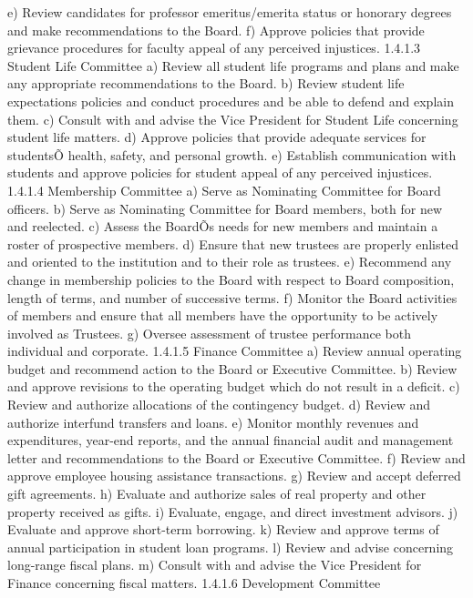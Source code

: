 \documentclass[letterpaper, 11pt]{article}
\begin{document}
			e) Review candidates for professor emeritus/emerita status or honorary degrees and make recommendations to the Board.
			f) Approve policies that provide grievance procedures for faculty appeal of any perceived injustices.
			1.4.1.3 Student Life Committee
			a) Review all student life programs and plans and make any appropriate recommendations to the Board.
			b) Review student life expectations policies and conduct procedures and be able to defend and explain them.
			c) Consult with and advise the Vice President for Student Life concerning student life matters.
			d) Approve policies that provide adequate services for studentsÕ health, safety, and personal growth.
			e) Establish communication with students and approve policies for student appeal of any perceived injustices.
			1.4.1.4 Membership Committee
			a) Serve as Nominating Committee for Board officers.
			b) Serve as Nominating Committee for Board members, both for new and reelected.
			c) Assess the BoardÕs needs for new members and maintain a roster of prospective members.
			d) Ensure that new trustees are properly enlisted and oriented to the institution and to their role as trustees.
			e) Recommend any change in membership policies to the Board with respect to Board composition, length of terms, and number of successive terms.
			f) Monitor the Board activities of members and ensure that all members have the opportunity to be actively involved as Trustees.
			g) Oversee assessment of trustee performance both individual and corporate.
			1.4.1.5 Finance Committee
			a) Review annual operating budget and recommend action to the Board or Executive Committee.
			b) Review and approve revisions to the operating budget which do not result in a deficit.
			c) Review and authorize allocations of the contingency budget.
			d) Review and authorize interfund transfers and loans.
			e) Monitor monthly revenues and expenditures, year-end reports, and the annual financial audit and management letter and recommendations to the Board or Executive Committee.
			f) Review and approve employee housing assistance transactions.
			g) Review and accept deferred gift agreements.
			h) Evaluate and authorize sales of real property and other property received as gifts.
			i) Evaluate, engage, and direct investment advisors.
			j) Evaluate and approve short-term borrowing.
			k) Review and approve terms of annual participation in student loan programs.
			l) Review and advise concerning long-range fiscal plans.
			m) Consult with and advise the Vice President for Finance concerning fiscal matters.
			1.4.1.6 Development Committee
\end{document}
